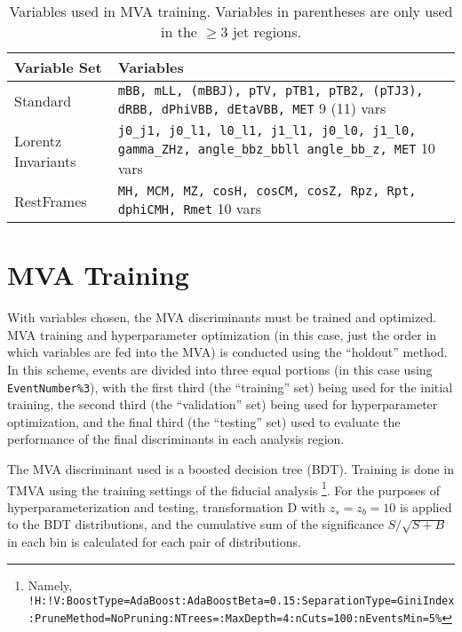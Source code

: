 \begin{table}[!htbp]\captionsetup{justification=centering}

  \begin{center}\begin{tabular}{l|p{4.5in}}
      \hline\hline
      Variable Set & Variables\\
      \hline
      Standard & \texttt{mBB,\- mLL, (mBBJ),\- pTV,\- pTB1,\- pTB2,\- (pTJ3),\- dRBB,\- dPhiVBB,\- dEtaVBB,\- MET} 9 (11) vars\\
      Lorentz Invariants &  \texttt{j0\_j1,\- j0\_l1,\- l0\_l1,\- j1\_l1,\- j0\_l0,\- j1\_l0,\- gamma\_ZHz,\- angle\_bbz\_bbll\- angle\_bb\_z,\- MET} 10 vars\\
      RestFrames & \texttt{MH,\- MCM,\- MZ,\- cosH,\- cosCM,\- cosZ,\- Rpz,\- Rpt,\- dphiCMH,\- Rmet} 10 vars\\
      \hline\hline
    \end{tabular}
    \caption{Variables used in MVA training.  Variables in parentheses are only used in the $\ge 3$ jet regions.}
    \label{tab:variables}
  \end{center}
\end{table}



\section{MVA Training}
\label{sec:mvatra}
With variables chosen, the MVA discriminants must be trained and optimized.  MVA training and hyperparameter optimization (in this case, just the order in which variables are fed into the MVA) is conducted using the ``holdout'' method.
  In this scheme, events are divided into three equal portions (in this case using \texttt{EventNumber\%3}), with the first third (the ``training'' set) being used for the initial training, the second third (the ``validation'' set) being used for hyperparameter optimization, and the final third (the ``testing'' set) used to evaluate the performance of the final discriminants in each analysis region.

The MVA discriminant used is a boosted decision tree (BDT).  Training is done in TMVA using the training settings of the fiducial analysis \cite{supportnote}\footnote{Namely, \texttt{!H:\-!V:\-BoostType=\-AdaBoost:\-AdaBoostBeta=0.15:\-SeparationType=\-GiniIndex:\-PruneMethod=\-NoPruning:\-NTrees=:\-MaxDepth=4:\-nCuts=100:\-nEventsMin=5\%}}.  For the purposes of hyperparameterization and testing, transformation D with $z_s=z_b=10$ is applied to the BDT distributions, and the cumulative sum of the significance $S/\sqrt{S+B}$ in each bin is calculated for each pair of distributions.  

